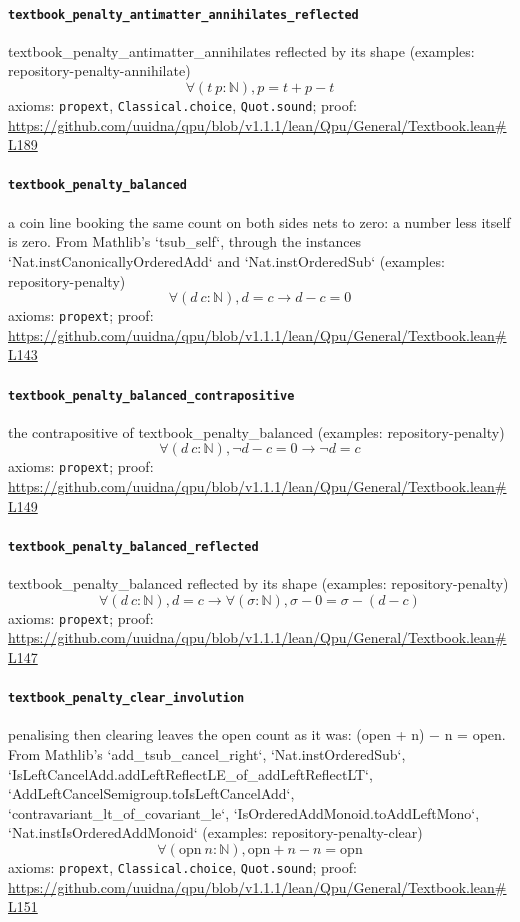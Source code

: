 \documentclass[11pt]{article}
\begin{document}
\paragraph{\texttt{textbook\_penalty\_antimatter\_annihilates\_reflected}}
textbook\_penalty\_antimatter\_annihilates reflected by its shape (examples: repository-penalty-annihilate)
\[ \forall (t\ p : \mathbb{N}), p = t + p - t \]
\noindent axioms: \texttt{propext}, \texttt{Classical.choice}, \texttt{Quot.sound}; proof: \url{https://github.com/uuidna/qpu/blob/v1.1.1/lean/Qpu/General/Textbook.lean\#L189}

\paragraph{\texttt{textbook\_penalty\_balanced}}
a coin line booking the same count on both sides nets to zero: a number less itself is zero. From Mathlib's `tsub\_self`, through the instances `Nat.instCanonicallyOrderedAdd` and `Nat.instOrderedSub` (examples: repository-penalty)
\[ \forall (d\ c : \mathbb{N}), d = c \to d - c = 0 \]
\noindent axioms: \texttt{propext}; proof: \url{https://github.com/uuidna/qpu/blob/v1.1.1/lean/Qpu/General/Textbook.lean\#L143}

\paragraph{\texttt{textbook\_penalty\_balanced\_contrapositive}}
the contrapositive of textbook\_penalty\_balanced (examples: repository-penalty)
\[ \forall (d\ c : \mathbb{N}), \neg d - c = 0 \to \neg d = c \]
\noindent axioms: \texttt{propext}; proof: \url{https://github.com/uuidna/qpu/blob/v1.1.1/lean/Qpu/General/Textbook.lean\#L149}

\paragraph{\texttt{textbook\_penalty\_balanced\_reflected}}
textbook\_penalty\_balanced reflected by its shape (examples: repository-penalty)
\[ \forall (d\ c : \mathbb{N}), d = c \to \forall (\sigma : \mathbb{N}), \sigma - 0 = \sigma - (d - c) \]
\noindent axioms: \texttt{propext}; proof: \url{https://github.com/uuidna/qpu/blob/v1.1.1/lean/Qpu/General/Textbook.lean\#L147}

\paragraph{\texttt{textbook\_penalty\_clear\_involution}}
penalising then clearing leaves the open count as it was: (open + n) − n = open. From Mathlib's `add\_tsub\_cancel\_right`, `Nat.instOrderedSub`, `IsLeftCancelAdd.addLeftReflectLE\_of\_addLeftReflectLT`, `AddLeftCancelSemigroup.toIsLeftCancelAdd`, `contravariant\_lt\_of\_covariant\_le`, `IsOrderedAddMonoid.toAddLeftMono`, `Nat.instIsOrderedAddMonoid` (examples: repository-penalty-clear)
\[ \forall (\mathrm{opn}\ n : \mathbb{N}), \mathrm{opn} + n - n = \mathrm{opn} \]
\noindent axioms: \texttt{propext}, \texttt{Classical.choice}, \texttt{Quot.sound}; proof: \url{https://github.com/uuidna/qpu/blob/v1.1.1/lean/Qpu/General/Textbook.lean\#L151}
\end{document}

